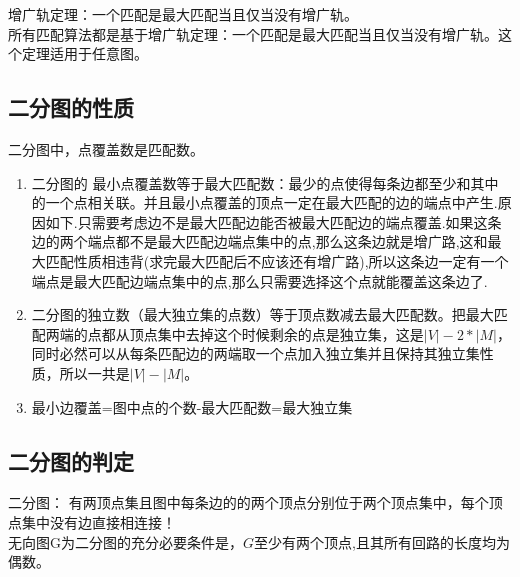 增广轨定理：一个匹配是最大匹配当且仅当没有增广轨。 \\
所有匹配算法都是基于增广轨定理：一个匹配是最大匹配当且仅当没有增广轨。这个定理适用于任意图。 \\

\subsection{二分图的性质}
二分图中，点覆盖数是匹配数。
\begin{enumerate}
\item 二分图的 最小点覆盖数等于最大匹配数：最少的点使得每条边都至少和其中的一个点相关联。并且最小点覆盖的顶点一定在最大匹配的边的端点中产生.原因如下.只需要考虑边不是最大匹配边能否被最大匹配边的端点覆盖.如果这条边的两个端点都不是最大匹配边端点集中的点,那么这条边就是增广路,这和最大匹配性质相违背(求完最大匹配后不应该还有增广路),所以这条边一定有一个端点是最大匹配边端点集中的点,那么只需要选择这个点就能覆盖这条边了.
\item 二分图的独立数（最大独立集的点数）等于顶点数减去最大匹配数。把最大匹配两端的点都从顶点集中去掉这个时候剩余的点是独立集，这是$|V|-2*|M|$，同时必然可以从每条匹配边的两端取一个点加入独立集并且保持其独立集性质，所以一共是$|V|-|M|$。
\item 最小边覆盖=图中点的个数-最大匹配数=最大独立集
\end{enumerate}

\subsection{二分图的判定}
二分图： 有两顶点集且图中每条边的的两个顶点分别位于两个顶点集中，每个顶点集中没有边直接相连接！ \\
无向图G为二分图的充分必要条件是，$G$至少有两个顶点,且其所有回路的长度均为偶数。 \\

